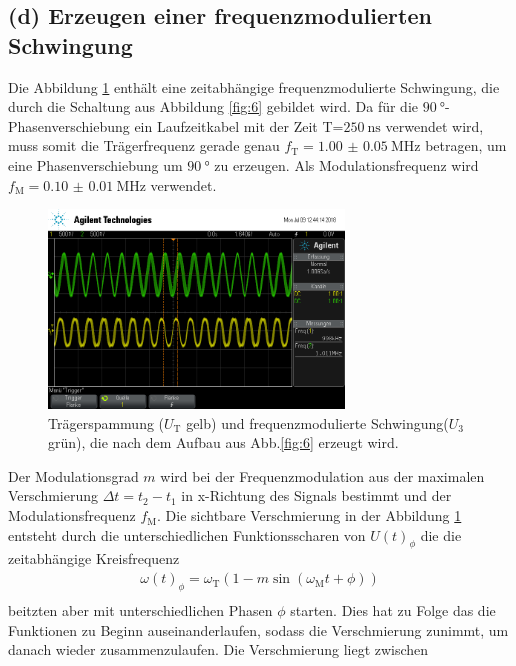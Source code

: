 \FloatBarrier
\subsection{(d) Erzeugen einer frequenzmodulierten Schwingung}
\label{subsec:auswertung_d}
Die Abbildung \ref{fig:freq_zeit} enthält eine zeitabhängige frequenzmodulierte
Schwingung, die durch die Schaltung aus Abbildung \ref{fig:6}
gebildet wird.
Da für die  $\SI{90}{\degree}$-Phasenverschiebung ein Laufzeitkabel mit der
Zeit T=$\SI{250}{\nano\second}$ verwendet wird, muss somit die
Trägerfrequenz gerade genau $f_{\text{T}} = \SI{1.00(5)}{\mega\hertz}$
betragen, um eine Phasenverschiebung um $\SI{90}{\degree}$
zu erzeugen. Als Modulationsfrequenz wird
$f_{\text{M}}=\SI{0.10(1)}{\mega\hertz}$ verwendet.

\begin{figure}
  \centering
  \includegraphics[width=0.7\textwidth]{osci/freq_mod.png}
  \caption{Trägerspammung ($U_{\text{T}}$ gelb) und frequenzmodulierte
  Schwingung($U_3$ grün), die nach dem Aufbau aus Abb.\ref{fig:6} erzeugt wird.}
  \label{fig:freq_zeit}
\end{figure}
Der Modulationsgrad $m$ wird
bei der Frequenzmodulation
aus der maximalen Verschmierung
$\Delta t=t_2-t_1$ in x-Richtung des Signals bestimmt
und der Modulationsfrequenz $f_{\text{M}}$.
Die sichtbare Verschmierung in der
Abbildung \ref{fig:freq_zeit}
entsteht durch die unterschiedlichen
Funktionsscharen von $U(t)_{\phi}$ die
die zeitabhängige Kreisfrequenz
\begin{align}
\omega(t)_{\phi}=\omega_\text{T}\left(1-m\sin(\omega_\text{M}t + \phi)\right)\\
\end{align}
beitzten aber mit unterschiedlichen Phasen $\phi$ starten.
Dies hat zu Folge das die Funktionen zu Beginn
auseinanderlaufen, sodass die Verschmierung
zunimmt, um danach wieder
zusammenzulaufen.
Die Verschmierung liegt zwischen
